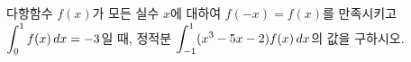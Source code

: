 다항함수 $f(x)$가 모든 실수 $x$에 대하여 $f(-x)=f(x)$를 만족시키고 $\displaystyle\int_{0}^{1}f(x)\mkern3mu dx=-3$일 때, 정적분 $\displaystyle\int_{-1}^{1}(x^3-5x-2)f(x)\mkern3mu dx$의 값을 구하시오.
